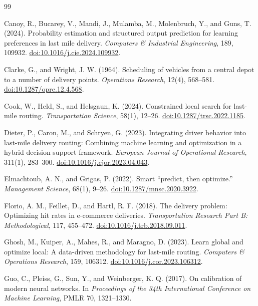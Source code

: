 \documentclass[11pt,a4paper]{article}
\begin{document}
\begin{thebibliography}{99}

Canoy, R., Bucarey, V., Mandi, J., Mulamba, M., Molenbruch, Y., and Guns, T. (2024).
Probability estimation and structured output prediction for learning preferences in last mile delivery.
\emph{Computers \& Industrial Engineering}, 189, 109932.
\href{https://doi.org/10.1016/j.cie.2024.109932}{doi:10.1016/j.cie.2024.109932}.

Clarke, G., and Wright, J. W. (1964).
Scheduling of vehicles from a central depot to a number of delivery points.
\emph{Operations Research}, 12(4), 568--581.
\href{https://doi.org/10.1287/opre.12.4.568}{doi:10.1287/opre.12.4.568}.

Cook, W., Held, S., and Helsgaun, K. (2024).
Constrained local search for last-mile routing.
\emph{Transportation Science}, 58(1), 12--26.
\href{https://doi.org/10.1287/trsc.2022.1185}{doi:10.1287/trsc.2022.1185}.

Dieter, P., Caron, M., and Schryen, G. (2023).
Integrating driver behavior into last-mile delivery routing: Combining machine learning and optimization in a hybrid decision support framework.
\emph{European Journal of Operational Research}, 311(1), 283--300.
\href{https://doi.org/10.1016/j.ejor.2023.04.043}{doi:10.1016/j.ejor.2023.04.043}.

Elmachtoub, A. N., and Grigas, P. (2022).
Smart ``predict, then optimize.''
\emph{Management Science}, 68(1), 9--26.
\href{https://doi.org/10.1287/mnsc.2020.3922}{doi:10.1287/mnsc.2020.3922}.

Florio, A. M., Feillet, D., and Hartl, R. F. (2018).
The delivery problem: Optimizing hit rates in e-commerce deliveries.
\emph{Transportation Research Part B: Methodological}, 117, 455--472.
\href{https://doi.org/10.1016/j.trb.2018.09.011}{doi:10.1016/j.trb.2018.09.011}.

Ghosh, M., Kuiper, A., Mahes, R., and Maragno, D. (2023).
Learn global and optimize local: A data-driven methodology for last-mile routing.
\emph{Computers \& Operations Research}, 159, 106312.
\href{https://doi.org/10.1016/j.cor.2023.106312}{doi:10.1016/j.cor.2023.106312}.

Guo, C., Pleiss, G., Sun, Y., and Weinberger, K. Q. (2017).
On calibration of modern neural networks.
In \emph{Proceedings of the 34th International Conference on Machine Learning}, PMLR 70, 1321--1330.


\end{thebibliography}
\end{document}
